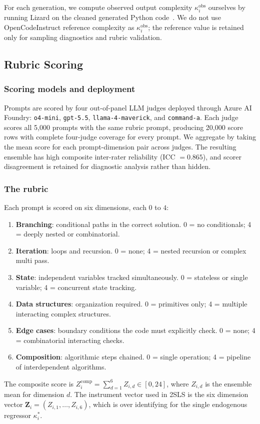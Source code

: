 \documentclass{article}
\begin{document}
For each generation, we compute observed output complexity $\kappa_i^{\text{obs}}$ ourselves by running Lizard on the cleaned generated Python code~\cite{lizard}. We do not use OpenCodeInstruct reference complexity as $\kappa_i^{\text{obs}}$; the reference value is retained only for sampling diagnostics and rubric validation.

\subsection{Rubric Scoring}

\subsubsection{Scoring models and deployment}
Prompts are scored by four out-of-panel LLM judges deployed through Azure AI Foundry: \texttt{o4-mini}, \texttt{gpt-5.5}, \texttt{llama-4-maverick}, and \texttt{command-a}. Each judge scores all 5{,}000 prompts with the same rubric prompt, producing 20{,}000 score rows with complete four-judge coverage for every prompt. We aggregate by taking the mean score for each prompt-dimension pair across judges. The resulting ensemble has high composite inter-rater reliability (ICC $=0.865$), and scorer disagreement is retained for diagnostic analysis rather than hidden.

\subsubsection{The rubric}
Each prompt is scored on six dimensions, each $0$ to $4$:

\begin{enumerate}
\item \textbf{Branching}: conditional paths in the correct solution. 0 = no conditionals; 4 = deeply nested or combinatorial.
\item \textbf{Iteration}: loops and recursion. 0 = none; 4 = nested recursion or complex multi pass.
\item \textbf{State}: independent variables tracked simultaneously. 0 = stateless or single variable; 4 = concurrent state tracking.
\item \textbf{Data structures}: organization required. 0 = primitives only; 4 = multiple interacting complex structures.
\item \textbf{Edge cases}: boundary conditions the code must explicitly check. 0 = none; 4 = combinatorial interacting checks.
\item \textbf{Composition}: algorithmic steps chained. 0 = single operation; 4 = pipeline of interdependent algorithms.
\end{enumerate}
The composite score is $Z_i^{\text{comp}} = \sum_{d=1}^{6} Z_{i,d} \in [0,24]$, where $Z_{i,d}$ is the ensemble mean for dimension $d$. The instrument vector used in 2SLS is the six dimension vector $\mathbf{Z}_i = (Z_{i,1},\ldots,Z_{i,6})$, which is over identifying for the single endogenous regressor $\kappa_i^*$.
\end{document}
